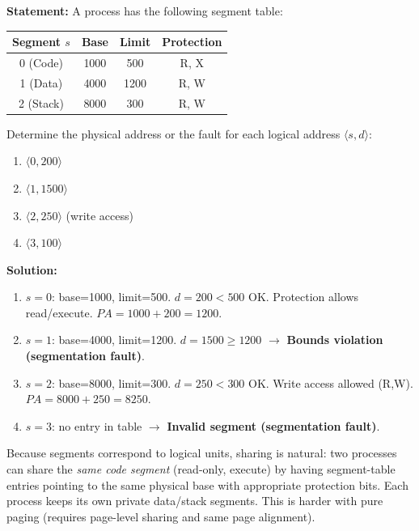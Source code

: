 \documentclass[11pt]{article}
\begin{document}
\begin{exoresolu}
\textbf{Statement:} A process has the following segment table:
\begin{center}
\begin{tabular}{|c|c|c|c|}\hline
Segment $s$ & Base & Limit & Protection \\ \hline
0 (Code) & 1000 & 500 & R, X \\
1 (Data) & 4000 & 1200 & R, W \\
2 (Stack) & 8000 & 300 & R, W \\ \hline
\end{tabular}
\end{center}
Determine the physical address or the fault for each logical address $\langle s, d \rangle$:
\begin{enumerate}
    \item $\langle 0, 200 \rangle$
    \item $\langle 1, 1500 \rangle$
    \item $\langle 2, 250 \rangle$ (write access)
    \item $\langle 3, 100 \rangle$
\end{enumerate}

\tcblower

\textbf{Solution:}
\begin{enumerate}
    \item $s=0$: base=1000, limit=500. $d=200 < 500$ OK. Protection allows read/execute. $PA = 1000+200 = 1200$.
    \item $s=1$: base=4000, limit=1200. $d=1500 \ge 1200$ $\to$ \textbf{Bounds violation (segmentation fault)}.
    \item $s=2$: base=8000, limit=300. $d=250 < 300$ OK. Write access allowed (R,W). $PA = 8000+250 = 8250$.
    \item $s=3$: no entry in table $\to$ \textbf{Invalid segment (segmentation fault)}.
\end{enumerate}
\end{exoresolu}

\begin{aretenir}
Because segments correspond to logical units, sharing is natural: two processes can share the \emph{same code segment} (read-only, execute) by having segment-table entries pointing to the same physical base with appropriate protection bits. Each process keeps its own private data/stack segments. This is harder with pure paging (requires page-level sharing and same page alignment).
\end{aretenir}
\end{document}
